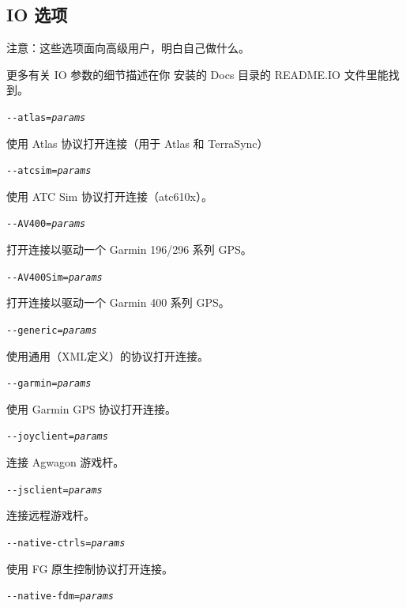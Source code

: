 {
  \subsection{IO 选项}
注意：这些选项面向高级用户，明白自己做什么。

更多有关 IO 参数的细节描述在你 \FlightGear{} 安装的 Docs 目录的 README.IO 文件里能找到。

\begin{itemize}

  \item{\texttt{-$ $-atlas={\it params}}}

  使用 Atlas 协议打开连接（用于 Atlas 和 TerraSync）

 \item{\texttt{-$ $-atcsim={\it params}}}

  使用 ATC Sim 协议打开连接（atc610x）。

 \item{\texttt{-$ $-AV400={\it params}}}

  打开连接以驱动一个 Garmin 196/296 系列 GPS。 

 \item{\texttt{-$ $-AV400Sim={\it params}}}

  打开连接以驱动一个 Garmin 400 系列 GPS。

 \item{\texttt{-$ $-generic={\it params}}}

  使用通用（XML定义）的协议打开连接。

 \item{\texttt{-$ $-garmin={\it params}}}
   
  使用 Garmin GPS 协议打开连接。

 \item{\texttt{-$ $-joyclient={\it params}}}
  
  连接 Agwagon 游戏杆。

 \item{\texttt{-$ $-jsclient={\it params}}}

  连接远程游戏杆。

 \item{\texttt{-$ $-native-ctrls={\it params}}

  使用 FG 原生控制协议打开连接。

 \item{\texttt{-$ $-native-fdm={\it params}}}

}
\end{itemize}}
